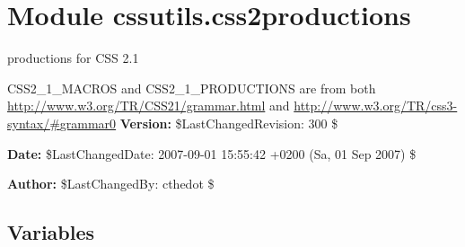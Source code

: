 %
%
%


\section{Module cssutils.css2productions}

    \label{cssutils:css2productions}

productions for CSS 2.1

CSS2{\_}1{\_}MACROS and CSS2{\_}1{\_}PRODUCTIONS are from both
\href{http://www.w3.org/TR/CSS21/grammar.html}{http://www.w3.org/TR/CSS21/grammar.html} and
\href{http://www.w3.org/TR/css3-syntax/\#grammar0}{http://www.w3.org/TR/css3-syntax/{\#}grammar0}
\textbf{Version:} \$LastChangedRevision: 300 \$



\textbf{Date:} \$LastChangedDate: 2007-09-01 15:55:42 +0200 (Sa, 01 Sep 2007) \$



\textbf{Author:} \$LastChangedBy: cthedot \$





  \subsection{Variables}

